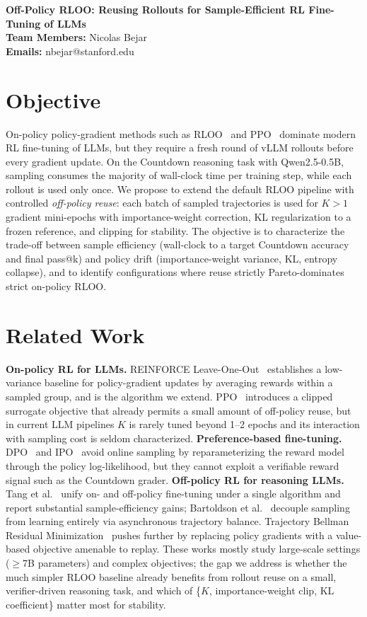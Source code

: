 \documentclass{article}
\makeatletter
\renewcommand{\maketitle}{
  \begin{center}
    {\bf \large Off-Policy RLOO: Reusing Rollouts for Sample-Efficient RL Fine-Tuning of LLMs}\\
    \vspace{0.1cm}
    {\bf Team Members:} Nicolas Bejar\\
    \vspace{0.1cm}
    {\bf Emails:} nbejar@stanford.edu\\
    \vspace{0.2cm}
  \end{center}
}
\makeatother
\begin{document}
\maketitle

\section{Objective}
On-policy policy-gradient methods such as RLOO~\cite{rloo} and PPO~\cite{ppo} dominate modern RL fine-tuning of LLMs, but they require a fresh round of vLLM rollouts before every gradient update. On the Countdown reasoning task with Qwen2.5-0.5B, sampling consumes the majority of wall-clock time per training step, while each rollout is used only once. We propose to extend the default RLOO pipeline with controlled \emph{off-policy reuse}: each batch of sampled trajectories is used for $K{>}1$ gradient mini-epochs with importance-weight correction, KL regularization to a frozen reference, and clipping for stability. The objective is to characterize the trade-off between sample efficiency (wall-clock to a target Countdown accuracy and final pass@k) and policy drift (importance-weight variance, KL, entropy collapse), and to identify configurations where reuse strictly Pareto-dominates strict on-policy RLOO.

\section{Related Work}
\textbf{On-policy RL for LLMs.} REINFORCE Leave-One-Out~\cite{rloo} establishes a low-variance baseline for policy-gradient updates by averaging rewards within a sampled group, and is the algorithm we extend. PPO~\cite{ppo} introduces a clipped surrogate objective that already permits a small amount of off-policy reuse, but in current LLM pipelines $K$ is rarely tuned beyond 1--2 epochs and its interaction with sampling cost is seldom characterized. \textbf{Preference-based fine-tuning.} DPO~\cite{dpo} and IPO~\cite{ipo} avoid online sampling by reparameterizing the reward model through the policy log-likelihood, but they cannot exploit a verifiable reward signal such as the Countdown grader. \textbf{Off-policy RL for reasoning LLMs.} Tang et al.~\cite{tang2025singlealg} unify on- and off-policy fine-tuning under a single algorithm and report substantial sample-efficiency gains; Bartoldson et al.~\cite{tba} decouple sampling from learning entirely via asynchronous trajectory balance. Trajectory Bellman Residual Minimization~\cite{tbrm} pushes further by replacing policy gradients with a value-based objective amenable to replay. These works mostly study large-scale settings ($\geq$7B parameters) and complex objectives; the gap we address is whether the much simpler RLOO baseline already benefits from rollout reuse on a small, verifier-driven reasoning task, and which of \{$K$, importance-weight clip, KL coefficient\} matter most for stability.
\end{document}

